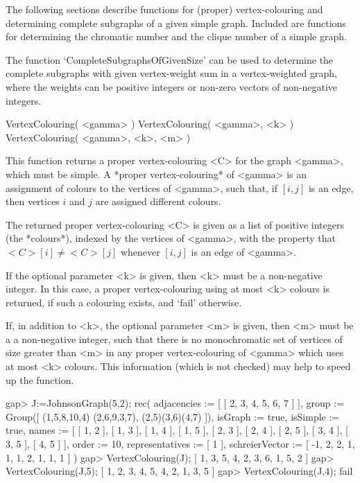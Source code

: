 %
%
%
%
\def\GRAPE{\sf GRAPE}
\def\nauty{\it nauty}
\def\G{\Gamma}
\def\Aut{{\rm Aut}\,}
\def\x{\times}

The following sections describe functions for (proper) vertex-colouring
and determining complete subgraphs of a given simple graph. Included are
functions for determining the chromatic number and the clique number of
a simple graph.

The function `CompleteSubgraphsOfGivenSize' can be used to determine
the complete subgraphs with given vertex-weight sum in a vertex-weighted
graph,
where the weights can be positive
integers or non-zero vectors of non-negative integers.


\>VertexColouring( <gamma> )
\>VertexColouring( <gamma>, <k> )
\>VertexColouring( <gamma>, <k>, <m> )

This function returns a proper vertex-colouring <C> for the graph
<gamma>, which must be simple. A *proper vertex-colouring*
of <gamma> is an assignment of colours to the vertices
of <gamma>, such that, if $[i,j]$ is an edge, then vertices $i$ and $j$
are assigned different colours.

The returned proper vertex-colouring <C> is given as a list of positive
integers (the *colours*), indexed by the vertices of <gamma>, with the
property that $<C>[i]\not=<C>[j]$ whenever $[i,j]$ is an edge of <gamma>.

If the optional parameter <k> is given, then <k> must be a non-negative
integer. In this case, a proper vertex-colouring using at most <k>
colours is returned, if such a colouring exists, and `fail' otherwise.

If, in addition to <k>, the optional parameter <m> is given, then <m>
must be a a non-negative integer, such that there is no monochromatic
set of vertices of size greater than <m> in any proper vertex-colouring
of <gamma> which uses at most <k> colours.  This information (which is
not checked) may help to speed up the function.

\beginexample
gap> J:=JohnsonGraph(5,2);
rec( adjacencies := [ [ 2, 3, 4, 5, 6, 7 ] ], group := Group([ (1,5,8,10,4)
  (2,6,9,3,7), (2,5)(3,6)(4,7) ]), isGraph := true, isSimple := true, 
  names := [ [ 1, 2 ], [ 1, 3 ], [ 1, 4 ], [ 1, 5 ], [ 2, 3 ], [ 2, 4 ], 
      [ 2, 5 ], [ 3, 4 ], [ 3, 5 ], [ 4, 5 ] ], order := 10, 
  representatives := [ 1 ], schreierVector := [ -1, 2, 2, 1, 1, 1, 2, 1, 1, 1 
     ] )
gap> VertexColouring(J);
[ 1, 3, 5, 4, 2, 3, 6, 1, 5, 2 ]
gap> VertexColouring(J,5);
[ 1, 2, 3, 4, 5, 4, 2, 1, 3, 5 ]
gap> VertexColouring(J,4);
fail
\endexample

